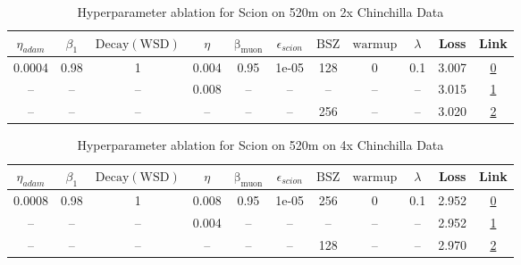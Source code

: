 \begin{table}[H]
\centering
\caption{Hyperparameter ablation for Scion on 520m on 2x Chinchilla Data}
\label{tab:ablation_scion_520m_2}
\begin{tabular}{ccccccccccc}
\toprule
$\eta_{adam}$ & $\beta_1$ & $\mathrm{Decay (WSD)}$ & $\eta$ & $\mathrm{\beta_{muon}}$ & $\epsilon_{scion}$ & $\mathrm{BSZ}$ & $\mathrm{warmup}$ & $\lambda$ & Loss & Link \\
\midrule
0.0004 & 0.98 & 1 & 0.004 & 0.95 & 1e-05 & 128 & 0 & 0.1 & 3.007 & \href{https://wandb.ai/stanford-mercury/optimizer-scaling/runs/sweep-520m-21B-scioni268e92lr0.004-wd0.1-minlr0-warmup0-b10.98-g-a22c53}{0} \\
\midrule
-- & -- & -- & 0.008 & -- & -- & -- & -- & -- & 3.015 & \href{https://wandb.ai/stanford-mercury/optimizer-scaling/runs/sweep-520m-21B-scioni941d43lr0.008-wd0.1-minlr0-warmup0-b10.98-g-7f3250}{1} \\
-- & -- & -- & -- & -- & -- & 256 & -- & -- & 3.020 & \href{https://wandb.ai/stanford-mercury/optimizer-scaling/runs/sweep-520m-21B-scioni310e59lr0.004-wd0.1-minlr0-warmup0-b10.98-g-d42b8b}{2} \\
\bottomrule
\end{tabular}
\end{table}

\begin{table}[H]
\centering
\caption{Hyperparameter ablation for Scion on 520m on 4x Chinchilla Data}
\label{tab:ablation_scion_520m_4}
\begin{tabular}{ccccccccccc}
\toprule
$\eta_{adam}$ & $\beta_1$ & $\mathrm{Decay (WSD)}$ & $\eta$ & $\mathrm{\beta_{muon}}$ & $\epsilon_{scion}$ & $\mathrm{BSZ}$ & $\mathrm{warmup}$ & $\lambda$ & Loss & Link \\
\midrule
0.0008 & 0.98 & 1 & 0.008 & 0.95 & 1e-05 & 256 & 0 & 0.1 & 2.952 & \href{https://wandb.ai/stanford-mercury/optimizer-scaling/runs/sweep-520m-42B-scion941d43lr0.008-wd0.1-minlr0-warmup0-b10.98-gn-ab5aa7}{0} \\
\midrule
-- & -- & -- & 0.004 & -- & -- & -- & -- & -- & 2.952 & \href{https://wandb.ai/stanford-mercury/optimizer-scaling/runs/sweep-520m-42B-scion268e92lr0.004-wd0.1-minlr0-warmup0-b10.98-gn-26c45d}{1} \\
-- & -- & -- & -- & -- & -- & 128 & -- & -- & 2.970 & \href{https://wandb.ai/stanford-mercury/optimizer-scaling/runs/sweep-520m-42B-scion32fc90lr0.008-wd0.1-minlr0-warmup0-b10.98-gn-202a50}{2} \\
\bottomrule
\end{tabular}
\end{table}

